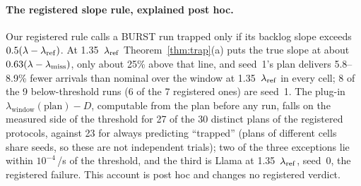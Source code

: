 \paragraph{The registered slope rule, explained post hoc.} Our registered rule calls a BURST run trapped only if its backlog slope
exceeds $0.5(\lambda-\lambda_{\mathrm{ref}})$. At 1.35~$\lambda_{\mathrm{ref}}$ Theorem~\ref{thm:trap}(a) puts the true slope at about $0.63(\lambda-\lambda_{\mathrm{miss}})$, only
about 25\% above that line, and seed~1's plan delivers 5.8--8.9\% fewer arrivals than nominal over the window at 1.35~$\lambda_{\mathrm{ref}}$ in
every cell; 8 of the 9 below-threshold runs (6 of the 7 registered ones) are seed~1. The plug-in $\lambda_{\mathrm{window}}(\text{plan})-D$, computable from the
plan before any run, falls on the measured side of the threshold for 27 of the 30 distinct plans of the registered protocols, against
23 for always predicting ``trapped'' (plans of different cells share seeds, so these are not independent trials); two of the three
exceptions lie within $10^{-4}$\,/s of the threshold, and the third is Llama at 1.35~$\lambda_{\mathrm{ref}}$, seed~0, the registered failure. This
account is post hoc and changes no registered verdict.

